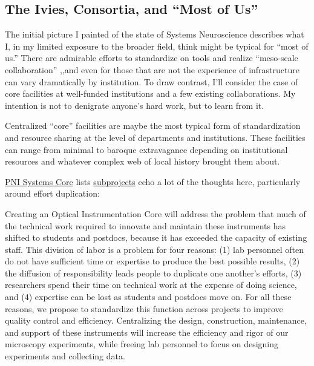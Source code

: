 \documentclass[nohyper]{tufte-book-jls}
\begin{document}
\hypertarget{the-ivies-consortia-and-most-of-us}{%
\subsection{The Ivies, Consortia, and ``Most of
Us''}\label{the-ivies-consortia-and-most-of-us}}

The initial picture I painted of the state of Systems Neuroscience
describes what I, in my limited exposure to the broader field, think
might be typical for ``most of us.'' There are admirable efforts to
standardize on tools and realize ``meso-scale collaboration'' \cite{mainenBetterWayCrack2016},,and even for those that are not the
experience of infrastructure can vary dramatically by institution. To
draw contrast, I'll consider the case of core facilities at well-funded
institutions and a few existing collaborations. My intention is not to
denigrate anyone's hard work, but to learn from it.

Centralized ``core'' facilities are maybe the most typical form of
standardization and resource sharing at the level of departments and
institutions. These facilities can range from minimal to baroque
extravagance depending on institutional resources and whatever complex
web of local history brought them about.

\href{https://projectreporter.nih.gov/project_info_details.cfm?aid=9444124}{PNI
Systems Core} lists
\href{https://projectreporter.nih.gov/project_info_subprojects.cfm?aid=9444124\&icde=0}{subprojects}
echo a lot of the thoughts here, particularly around effort
duplication:

\begin{leftbar}
Creating an Optical Instrumentation Core will address the problem that
much of the technical work required to innovate and maintain these
instruments has shifted to students and postdocs, because it has
exceeded the capacity of existing staff. This division of labor is a
problem for four reasons: (1) lab personnel often do not have sufficient
time or expertise to produce the best possible results, (2) the
diffusion of responsibility leads people to duplicate one another's
efforts, (3) researchers spend their time on technical work at the
expense of doing science, and (4) expertise can be lost as students and
postdocs move on. For all these reasons, we propose to standardize this
function across projects to improve quality control and efficiency.
Centralizing the design, construction, maintenance, and support of these
instruments will increase the efficiency and rigor of our microscopy
experiments, while freeing lab personnel to focus on designing
experiments and collecting data.
\end{leftbar}
\end{document}
